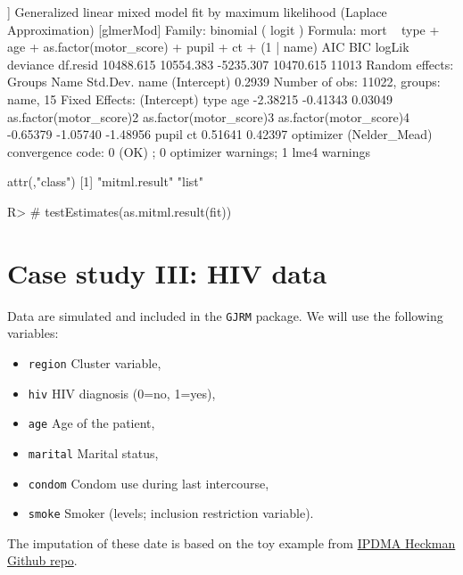 \documentclass[
]{jss}
\providecommand{\tightlist}{%
  \setlength{\itemsep}{0pt}\setlength{\parskip}{0pt}}
\begin{document}
\begin{CodeChunk}
\begin{CodeOutput}
[[5]]
Generalized linear mixed model fit by maximum likelihood (Laplace
  Approximation) [glmerMod]
 Family: binomial  ( logit )
Formula: mort ~ type + age + as.factor(motor_score) + pupil + ct + (1 |  
    name)
      AIC       BIC    logLik  deviance  df.resid 
10488.615 10554.383 -5235.307 10470.615     11013 
Random effects:
 Groups Name        Std.Dev.
 name   (Intercept) 0.2939  
Number of obs: 11022, groups:  name, 15
Fixed Effects:
            (Intercept)                     type                      age  
               -2.38215                 -0.41343                  0.03049  
as.factor(motor_score)2  as.factor(motor_score)3  as.factor(motor_score)4  
               -0.65379                 -1.05740                 -1.48956  
                  pupil                       ct  
                0.51641                  0.42397  
optimizer (Nelder_Mead) convergence code: 0 (OK) ; 0 optimizer warnings; 1 lme4 warnings 

attr(,"class")
[1] "mitml.result" "list"        
\end{CodeOutput}
\begin{CodeInput}
R> # testEstimates(as.mitml.result(fit))
\end{CodeInput}
\end{CodeChunk}

\hypertarget{case-study-iii-hiv-data}{%
\section{Case study III: HIV data}\label{case-study-iii-hiv-data}}

Data are simulated and included in the \texttt{GJRM} package. We will
use the following variables:

\begin{itemize}
\tightlist
\item
  \texttt{region} Cluster variable,
\item
  \texttt{hiv} HIV diagnosis (0=no, 1=yes),
\item
  \texttt{age} Age of the patient,
\item
  \texttt{marital} Marital status,
\item
  \texttt{condom} Condom use during last intercourse,
\item
  \texttt{smoke} Smoker (levels; inclusion restriction variable).
\end{itemize}

The imputation of these date is based on the toy example from
\href{https://github.com/johamunoz/Heckman-IPDMA/blob/main/Toy_example.R}{IPDMA
Heckman Github repo}.
\end{document}
